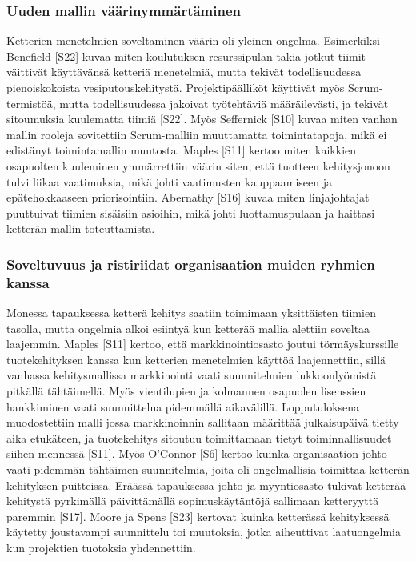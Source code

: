 \subsubsection{Uuden mallin väärinymmärtäminen}

Ketterien menetelmien soveltaminen väärin oli yleinen ongelma. Esimerkiksi
Benefield [S22] kuvaa miten koulutuksen resurssipulan takia jotkut tiimit
väittivät käyttävänsä ketteriä menetelmiä, mutta tekivät todellisuudessa
pienoiskokoista vesiputouskehitystä. Projektipäälliköt käyttivät myös
Scrum-termistöä, mutta todellisuudessa jakoivat työtehtäviä määräilevästi, ja
tekivät sitoumuksia kuulematta tiimiä [S22]. Myös Seffernick [S10] kuvaa miten
vanhan mallin rooleja sovitettiin Scrum-malliin muuttamatta toimintatapoja, mikä
ei edistänyt toimintamallin muutosta. Maples [S11] kertoo miten kaikkien
osapuolten kuuleminen ymmärrettiin väärin siten, että tuotteen kehitysjonoon
tulvi liikaa vaatimuksia, mikä johti vaatimusten kauppaamiseen ja
epätehokkaaseen priorisointiin. Abernathy [S16] kuvaa miten linjajohtajat
puuttuivat tiimien sisäisiin asioihin, mikä johti luottamuspulaan ja haittasi
ketterän mallin toteuttamista.

\subsubsection{Soveltuvuus ja ristiriidat organisaation muiden ryhmien kanssa}

Monessa tapauksessa ketterä kehitys saatiin toimimaan yksittäisten tiimien
tasolla, mutta ongelmia alkoi esiintyä kun ketterää mallia alettiin soveltaa
laajemmin. Maples [S11] kertoo, että markkinointiosasto joutui törmäyskurssille
tuotekehityksen kanssa kun ketterien menetelmien käyttöä laajennettiin, sillä
vanhassa kehitysmallissa markkinointi vaati suunnitelmien lukkoonlyömistä
pitkällä tähtäimellä. Myös vientilupien ja kolmannen osapuolen lisenssien
hankkiminen vaati suunnittelua pidemmällä aikavälillä. Lopputuloksena
muodostettiin malli jossa markkinoinnin sallitaan määrittää julkaisupäivä tietty
aika etukäteen, ja tuotekehitys sitoutuu toimittamaan tietyt toiminnallisuudet
siihen mennessä [S11]. Myös O'Connor [S6] kertoo kuinka organisaation johto
vaati pidemmän tähtäimen suunnitelmia, joita oli ongelmallisia toimittaa
ketterän kehityksen puitteissa. Eräässä tapauksessa johto ja myyntiosasto
tukivat ketterää kehitystä pyrkimällä päivittämällä sopimuskäytäntöjä sallimaan
ketteryyttä paremmin [S17]. Moore ja Spens [S23] kertovat kuinka ketterässä
kehityksessä käytetty joustavampi suunnittelu toi muutoksia, jotka aiheuttivat
laatuongelmia kun projektien tuotoksia yhdennettiin.


